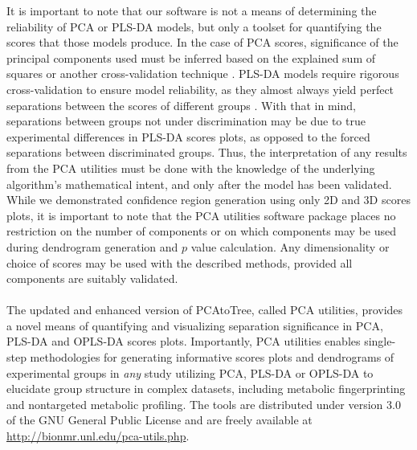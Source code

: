 \begin{doublespace}
It is important to note that our software is not a means of determining the
reliability of PCA or PLS-DA models, but only a toolset for quantifying the
scores that those models produce. In the case of PCA scores, significance of
the principal components used must be inferred based on the explained sum of
squares or another cross-validation technique
\cite{eastment:tech1982,krzanowski:biom1987}. PLS-DA models require
rigorous cross-validation to ensure model reliability, as they almost always
yield perfect separations between the scores of different groups
\cite{kjeldahl:jchemo2010}. With that in mind, separations between
groups not under discrimination may be due to true experimental differences in
PLS-DA scores plots, as opposed to the forced separations between discriminated
groups. Thus, the interpretation of any results from the PCA utilities must be
done with the knowledge of the underlying algorithm's mathematical intent, and
only after the model has been validated. While we demonstrated confidence
region generation using only 2D and 3D scores plots, it is important to note
that the PCA utilities software package places no restriction on the number of
components or on which components may be used during dendrogram generation and
$p$ value calculation. Any dimensionality or choice of scores may be used with
the described methods, provided all components are suitably validated.
\\\\
The updated and enhanced version of PCAtoTree, called PCA utilities, provides
a novel means of quantifying and visualizing separation significance in PCA,
PLS-DA and OPLS-DA scores plots. Importantly, PCA utilities enables single-step
methodologies for generating informative scores plots and dendrograms of
experimental groups in {\it any} study utilizing PCA, PLS-DA or OPLS-DA to
elucidate group structure in complex datasets, including metabolic
fingerprinting and nontargeted metabolic profiling. The tools are distributed
under version 3.0 of the GNU General Public License \cite{gpl3} and are freely
available at \url{http://bionmr.unl.edu/pca-utils.php}.
\end{doublespace}




